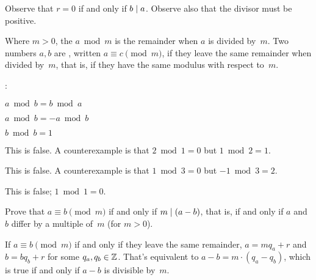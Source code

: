 \documentclass{ibl}  %
\begin{document}
\noindent 
Observe that $r=0$ if and only if $b\mid a$. 
Observe also that the divisor must be positive.

\begin{df}
Where $m>0$, the  $a\bmod m$ 
is the remainder when $a$ is divided by~$m$.
Two numbers $a,b$ are , 
written $a\equiv c\pmod m$, 
if they leave the same remainder when divided by~$m$, that is,
if they have the same modulus with respect to~$m$.
\end{df}

\begin{ex}\pord:
\begin{items}
\item $a\bmod b=b\bmod a$
\item $a\bmod b=-a\bmod b$
\item $b\bmod b=1$
\end{items}
\begin{ans}
\begin{exes}
\item This is false.
  A counterexample is that $2\bmod 1=0$ but $1\bmod 2=1$.
\item This is false.
  A counterexample is that $1\bmod 3=0$ but $-1\bmod 3=2$.
\item This is false;
  $1\bmod 1=0$.     
\end{exes}
\end{ans}
\end{ex}

\begin{ex} \label{ex:AEquivBpmodMIFFABDifferBYMultipleOfM}
Prove that $a\equiv b\pmod m$ if and only if $m\mid (a-b)$,
that is, if and only if $a$ and~$b$ differ by a multiple of~$m$
(for $m>0$).  
\begin{ans}
If $a\equiv b\pmod m$ if and only if they leave the same remainder,
$a=mq_a+r$ and~$b=bq_b+r$ for some $q_a,q_b\in\mathbb{Z}$.
That's equivalent to $a-b=m\cdot(q_a-q_b)$, 
which is true if and only if $a-b$ is divisible by~$m$.
\end{ans}
\end{ex}
\end{document}
